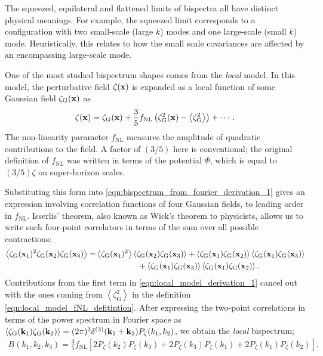 The squeezed, equilateral and flattened limits of bispectra all have distinct physical meanings. For example, the squeezed limit corresponds to a configuration with two small-scale (large $k$) modes and one large-scale (small $k$) mode. Heuristically, this relates to how the small scale covariances are affected by an encompassing large-scale mode.

One of the most studied bispectrum shapes comes from the \textit{local} model. In this model, the perturbative field $\zeta(\mathbf{x})$ is expanded as a local function of some Gaussian field $\zeta_\text{G}(\mathbf{x})$ as
\begin{align}
	\zeta(\mathbf{x}) = \zeta_\text{G}(\mathbf{x}) + \frac{3}{5} f_\text{NL} \left(\zeta_\text{G}^2(\mathbf{x}) - \left< \zeta_\text{G}^2 \right> \right) + \cdots. \label{eqn:local_model_fNL_defitintion}
\end{align}
The non-linearity parameter $f_\text{NL}$ measures the amplitude of quadratic contributions to the field. A factor of $(3/5)$ here is conventional; the original definition of $f_\text{NL}$ was written in terms of the potential $\Phi$, which is equal to $(3/5)\zeta$ on super-horizon scales.

Substituting this form into \eqref{eqn:bispectrum_from_fourier_derivation_1} gives an expression involving correlation functions of four Gaussian fields, to leading order in $f_\text{NL}$. Isserlis' theorem, also known as Wick's theorem to physicists, allows us to write such four-point correlators in terms of the sum over all possible contractions:
\begin{align}
	\left< \zeta_\text{G}(\vv{x}_1)^2 \zeta_\text{G}(\vv{x}_2) \zeta_\text{G}(\vv{x}_3) \right> = &\left< \zeta_\text{G}(\vv{x}_1)^2 \right> \left< \zeta_\text{G}(\vv{x}_2) \zeta_\text{G}(\vv{x}_3) \right> + \left< \zeta_\text{G}(\vv{x}_1) \zeta_\text{G}(\vv{x}_2) \right> \left< \zeta_\text{G}(\vv{x}_1) \zeta_\text{G}(\vv{x}_3) \right> \nonumber \\ &\hspace{0.15\textwidth} + \left< \zeta_\text{G}(\vv{x}_1) \zeta_\text{G}(\vv{x}_3) \right> \left< \zeta_\text{G}(\vv{x}_1) \zeta_\text{G}(\vv{x}_2) \right>. \label{eqn:local_model_derivation_1}
\end{align}
Contributions from the first term in \eqref{eqn:local_model_derivation_1} cancel out with the ones coming from $\left< \zeta_\text{G}^2 \right>$ in the definition \eqref{eqn:local_model_fNL_defitintion}. After expressing the two-point correlations in terms of the power spectrum in Fourier space as $\left< \zeta_\text{G}(\mathbf{k}_1) \zeta_\text{G}(\mathbf{k}_2) \right> = (2\pi)^3 \delta^{(3)}(\mathbf{k}_1 + \mathbf{k}_2) P_\zeta (k_1, k_2)$, we obtain the \textit{local} bispectrum;
\begin{align}
	B(k_1, k_2, k_3) = \frac{3}{5} f_\text{NL} \left[ 2P_\zeta(k_2) P_\zeta(k_3) + 2P_\zeta(k_3) P_\zeta(k_1) + 2P_\zeta(k_1) P_\zeta(k_2) \right]. \label{eqn:local_bispectrum_using_power_spectrum}
\end{align}

